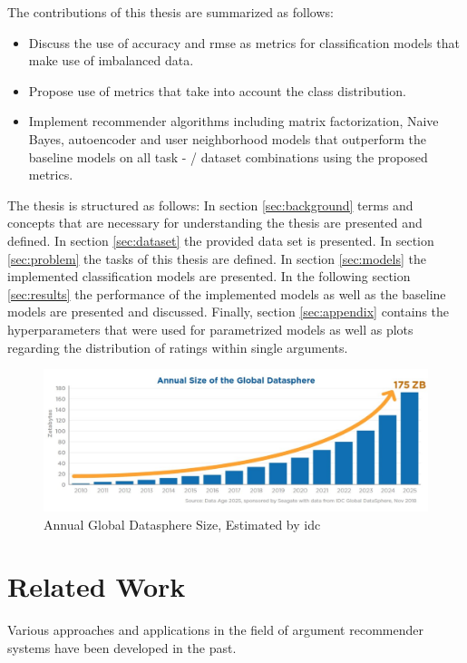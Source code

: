 The contributions of this thesis are summarized as follows:
\begin{itemize}
    \item Discuss the use of accuracy and \acrshort{rmse} as metrics for classification models that make use of imbalanced data.
    \item Propose use of metrics that take into account the class distribution.
    \item Implement recommender algorithms including matrix factorization, Naive Bayes, autoencoder and user neighborhood models that outperform the baseline models on all task - / dataset combinations using the proposed metrics.
 \end{itemize}
The thesis is structured as follows: In section \ref{sec:background} terms and concepts that are necessary for understanding the thesis are presented and defined. In section \ref{sec:dataset} the provided data set is presented. In section \ref{sec:problem} the tasks of this thesis are defined. In section \ref{sec:models} the implemented classification models are presented. In the following section \ref{sec:results} the performance of the implemented models as well as the baseline models are presented and discussed. Finally, section \ref{sec:appendix} contains the hyperparameters that were used for parametrized models as well as plots regarding the distribution of ratings within single arguments.  

\begin{figure}[t]
    \centering
    \includegraphics[width=1\textwidth]{images/annual_datasphere_growth.jpg}
    \caption{Annual Global Datasphere Size, Estimated by \acrshort{idc}}
    \label{fig:datasphere_growth}
\end{figure}

\section{Related Work}
Various approaches and applications in the field of argument recommender systems have been developed in the past.

